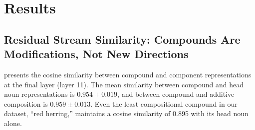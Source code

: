 \section{Results}
\label{sec:results}

\subsection{Residual Stream Similarity: Compounds Are Modifications, Not New Directions}
\label{sec:results_exp1}

 presents the cosine similarity between compound and component representations at the final layer (layer 11).
The mean similarity between compound and head noun representations is $0.954 \pm 0.019$, and between compound and additive composition is $0.959 \pm 0.013$.
Even the least compositional compound in our dataset, ``red herring,'' maintains a cosine similarity of 0.895 with its head noun alone.

\begin{table}[t]
    \centering
    \caption{Cosine similarity between compound representations and component representations at layer 11. All compounds maintain high similarity ($>0.89$) with their head nouns, indicating that compound representations are modifications of existing component directions rather than new directions. Best per-row result in \textbf{bold} when noteworthy.}
    \label{tab:cosine}
\end{table}

